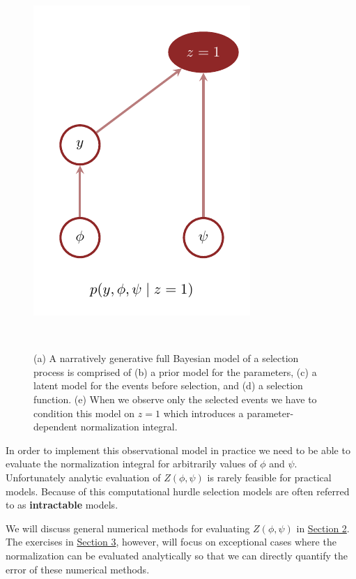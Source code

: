 \documentclass[
  letterpaper,
  DIV=11,
  numbers=noendperiod]{scrartcl}
\begin{document}
\begin{figure}
\begin{minipage}{0.25\linewidth}
{\captionsetup{labelsep=none}\includegraphics{figures/gms/conditioning/observed/observed.pdf}

}

\subcaption{\label{fig-gm-observed}}

\end{minipage}%
%
\begin{minipage}{0.38\linewidth}
~\end{minipage}%

\caption{\label{fig-gm-conditioning}(a) A narratively generative full
Bayesian model of a selection process is comprised of (b) a prior model
for the parameters, (c) a latent model for the events before selection,
and (d) a selection function. (e) When we observe only the selected
events we have to condition this model on \(z = 1\) which introduces a
parameter-dependent normalization integral.}

\end{figure}%

In order to implement this observational model in practice we need to be
able to evaluate the normalization integral for arbitrarily values of
\(\phi\) and \(\psi\). Unfortunately analytic evaluation of
\(Z(\phi, \psi)\) is rarely feasible for practical models. Because of
this computational hurdle selection models are often referred to as
\textbf{intractable} models.

We will discuss general numerical methods for evaluating
\(Z(\phi, \psi)\) in \href{@sec:estimation}{Section 2}. The exercises in
\href{@sec:demonstrations}{Section 3}, however, will focus on
exceptional cases where the normalization can be evaluated analytically
so that we can directly quantify the error of these numerical methods.
\end{document}
